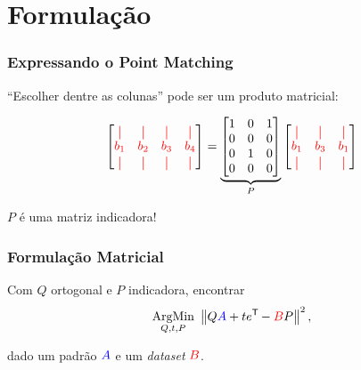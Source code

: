\section{Formulação}

\begin{frame}[fragile]
  \frametitle{Expressando o Point Matching}
  \begin{center}
    ``Escolher dentre as colunas'' pode ser um produto matricial:

    \[
      \begin{bmatrix}
        \red{\vert} & \red{\vert} & \red{\vert} & \red{\vert} \\
        \red{b_1} & \red{b_2} & \red{b_3} & \red{b_4} \\
        \red{\vert} & \red{\vert} & \red{\vert} & \red{\vert}
      \end{bmatrix}
      =
      \underbrace{\begin{bmatrix}
        1 & 0 & 1 \\
        0 & 0 & 0 \\
        0 & 1 & 0 \\
        0 & 0 & 0
      \end{bmatrix}}_{P}
      \begin{bmatrix}
        \red{\vert} & \red{\vert} & \red{\vert} \\
        \red{b_1} & \red{b_3} & \red{b_1} \\
        \red{\vert} & \red{\vert} & \red{\vert}
      \end{bmatrix}
    \]

    $P$ é uma matriz indicadora!
  \end{center}
\end{frame}

\begin{frame}
  \frametitle{Formulação Matricial}
  \begin{center}
    Com $Q$ ortogonal e $P$ indicadora, encontrar
    \[\underset{Q,t,P}{\text{ArgMin}}\,\, \left\lVert Q\textcolor{blue}{A} + t e^{\mathsf{T}\mkern-1mu} - \textcolor{red}{B}P\right\rVert^2,\]

    dado um padrão $\textcolor{blue}{A}$ e um \textit{dataset} $\textcolor{red}{B}$.
  \end{center}
\end{frame}
